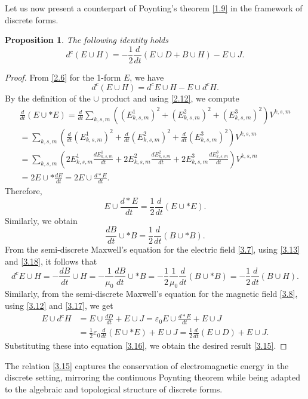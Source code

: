 \documentclass[english]{article}
\theoremstyle{plain}
\newtheorem{prop}[thm]{Proposition}
\theoremstyle{definition}
\theoremstyle{remark}
\numberwithin{equation}{section}
\begin{document}
Let us now present a counterpart of Poynting's theorem \eqref{1.9} in the framework of discrete forms.
\begin{prop}
The following identity holds
 \begin{equation}\label{3.15}
d^c(E\cup H)=-\frac{1}{2}\frac{d}{dt}(E\cup D+B\cup H)-E\cup J.
\end{equation}
\end{prop}
\begin{proof}
From \eqref{2.6} for the 1-form $E$, we have
\begin{equation}\label{3.16}
d^c(E\cup H)=d^cE\cup H-E\cup d^cH.
\end{equation}
By the definition of the $\cup$ product and using \eqref{2.12}, we  compute
\begin{align*}\label{}
\frac{d}{dt}(E\cup\ast E)=\frac{d}{dt}\sum_{k,s,m}\left((E^1_{k,s,m})^2+(E^2_{k,s,m})^2+(E^3_{k,s,m})^2\right)V^{k,s,m}\\
=\sum_{k,s,m}\left(\frac{d}{dt}(E^1_{k,s,m})^2+\frac{d}{dt}(E^2_{k,s,m})^2+\frac{d}{dt}(E^3_{k,s,m})^2\right)V^{k,s,m} \\
=\sum_{k,s,m}\left(2E^1_{k,s,m}\frac{dE^1_{k,s,m}}{dt}+2E^2_{k,s,m}\frac{dE^2_{k,s,m}}{dt}+2E^3_{k,s,m}\frac{dE^3_{k,s,m}}{dt}\right)V^{k,s,m}\\
=2E\cup\ast\frac{dE}{dt}=2E\cup\frac{d\ast E}{dt}.
\end{align*}
Therefore,
\begin{equation}\label{3.17}
E\cup\frac{d\ast E}{dt}=\frac{1}{2}\frac{d}{dt}(E\cup\ast E).
\end{equation}
Similarly, we obtain
\begin{equation}\label{3.18}
\frac{dB}{dt} \cup\ast B=\frac{1}{2}\frac{d}{dt}(B\cup\ast B).
\end{equation}
From the semi-discrete Maxwell's equation for the electric field \eqref{3.7}, using \eqref{3.13} and  \eqref{3.18}, it follows that
\begin{equation*}
d^cE\cup H=-\frac{dB}{dt}\cup H=-\frac{1}{\mu_0}\frac{dB}{dt}\cup\ast B=-\frac{1}{2}\frac{1}{\mu_0}\frac{d}{dt}(B\cup\ast B)=-\frac{1}{2}\frac{d}{dt}(B\cup H).
\end{equation*}
Similarly, from the semi-discrete Maxwell's equation for the magnetic field \eqref{3.8}, using \eqref{3.12}  and \eqref{3.17}, we get
\begin{align*}\label{}
E\cup d^cH&=E\cup \frac{dD}{dt}+E\cup J=\varepsilon_0E\cup \frac{d\ast E}{dt}+E\cup J \\&=\frac{1}{2}\varepsilon_0\frac{d}{dt}(E\cup\ast E)+E\cup J=\frac{1}{2}\frac{d}{dt}(E\cup D)+E\cup J.
\end{align*}
Substituting these into equation \eqref{3.16}, we obtain the desired result \eqref{3.15}.
\end{proof}
The relation \eqref{3.15} captures the conservation of electromagnetic energy in the discrete setting, mirroring the continuous Poynting theorem while being adapted to the algebraic and topological structure of discrete forms.
\end{document}
